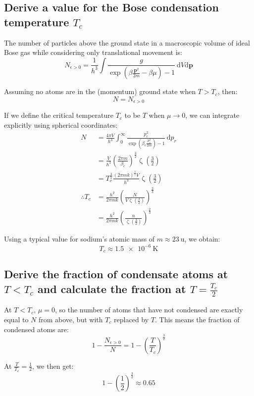\documentclass[a4paper]{scrartcl}
\begin{document}
\subsection{Derive a value for the Bose condensation temperature \(T_c\)}
The number of particles above the ground state in a macroscopic volume of ideal Bose gas while considering only translational movement is:
\[N_{\epsilon > 0} = \frac{1}{h^3} \int \frac{g}{\exp\left(\beta \frac{\mathbf{p}^2}{2 m} - \beta \mu\right) - 1} \:\mathrm{d} V \mathrm{d} \mathbf{p}\]

Assuming no atoms are in the (momentum) ground state when \(T > T_c\), then:
\[N = N_{\epsilon > 0}\]

If we define the critical temperature \(T_c\) to be \(T\) when \(\mu \to 0\), we can integrate explicitly using spherical coordinates:
\begin{align*}
    N &= \frac{4 \pi V}{h^3} \int_0^\infty \frac{p_r^2}{\exp\left(\beta_c \frac{p_r^2}{2 m}\right) - 1} \:\mathrm{d} p_r \\
    &= \frac{V}{h^3} \left(\frac{2 \pi m}{\beta_c}\right)^\frac{3}{2} \operatorname{\zeta}\left(\frac{3}{2}\right) \\
    &= T_c^\frac{3}{2} \frac{(2 \pi m k)^\frac{3}{2} V}{h^3} \operatorname{\zeta}\left(\frac{3}{2}\right) \\
    \therefore T_c &= \frac{h^2}{2 \pi m k} \left(\frac{N}{V \operatorname{\zeta}\left(\frac{3}{2}\right)}\right)^\frac{2}{3} \\
    &= \frac{h^2}{2 \pi m k} \left(\frac{n}{\operatorname{\zeta}\left(\frac{3}{2}\right)}\right)^\frac{2}{3}
\end{align*}

Using a typical value for sodium's atomic mass of \(m \approx \SI{23}{\atomicmassunit}\), we obtain:
\[T_c \approx \SI{1.5e-6}{\kelvin}\]

\subsection{Derive the fraction of condensate atoms at \(T < T_c\) and calculate the fraction at \(T = \frac{T_c}{2}\)}
At \(T < T_c\), \(\mu = 0\), so the number of atoms that have not condensed are exactly equal to \(N\) from above, but with \(T_c\) replaced by \(T\). This means the fraction of condensed atoms are:
\[1 - \frac{N_{\epsilon > 0}}{N} = 1 - \left(\frac{T}{T_c}\right)^\frac{3}{2}\]

At \(\frac{T}{T_c} = \frac{1}{2}\), we then get:
\[1 - \left(\frac{1}{2}\right)^\frac{3}{2} \approx 0.65\]
\end{document}
